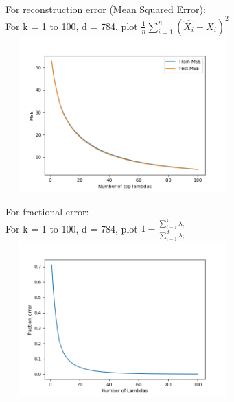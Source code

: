 \documentclass{article}
\begin{document}
 \\
For reconstruction error (Mean Squared Error): \\
For k = 1 to 100, d = 784,  plot $\frac{1}{n} \sum_{i=1}^{n} ( \hat{X_i} - X_i)^2 $ \\
\includegraphics[width=9cm, height=6cm]{plots/A6c_1.png} \newline

For fractional error: \\
For k = 1 to 100, d = 784,  plot $1 - \frac{\sum_{i=1}^{k} \lambda_i}{\sum_{i=1}^{d} \lambda_i}$ \\
\includegraphics[width=9cm, height=6cm]{plots/A6c_2.png} \newline
\end{document}
